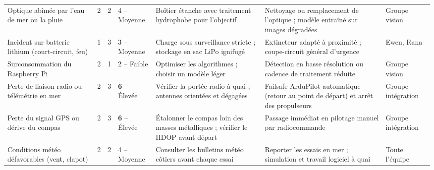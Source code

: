 \begin{table}[H]
\begin{tabularx}{\textwidth}{@{}>{\raggedright\arraybackslash}p{2.9cm}cc>{\centering\arraybackslash}p{1.7cm}LLp{1.9cm}@{}}
\addlinespace
Optique abîmée par l'eau de mer ou la pluie & 2 & 2 & 4 -- Moyenne & Boîtier étanche avec traitement hydrophobe pour l'objectif & Nettoyage ou remplacement de l'optique ; modèle entraîné sur images dégradées & Groupe vision \\
\addlinespace
Incident sur batterie lithium (court-circuit, feu) & 1 & 3 & 3 -- Moyenne & Charge sous surveillance stricte ; stockage en sac LiPo ignifugé & Extincteur adapté à proximité ; coupe-circuit général d'urgence & Ewen, Rana \\
\addlinespace
Surconsommation du Raspberry Pi & 2 & 1 & 2 -- Faible & Optimiser les algorithmes ; choisir un modèle léger & Détection en basse résolution ou cadence de traitement réduite & Groupe vision \\
\addlinespace
Perte de liaison radio ou télémétrie en mer & 2 & 3 & \textbf{6} -- Élevée & Vérifier la portée radio à quai ; antennes orientées et dégagées & Failsafe ArduPilot automatique (retour au point de départ) et arrêt des propulseurs & Groupe intégration \\
\addlinespace
Perte du signal GPS ou dérive du compas & 2 & 3 & \textbf{6} -- Élevée & Étalonner le compas loin des masses métalliques ; vérifier le HDOP avant départ & Passage immédiat en pilotage manuel par radiocommande & Groupe intégration \\
\addlinespace
Conditions météo défavorables (vent, clapot) & 2 & 2 & 4 -- Moyenne & Consulter les bulletins météo côtiers avant chaque essai & Reporter les essais en mer ; simulation et travail logiciel à quai & Toute l'équipe \\
\bottomrule
\end{tabularx}
\end{table}
